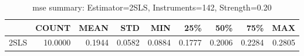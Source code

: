 \begin{table}[ht]
\centering
\caption{mse summary: Estimator=2SLS, Instruments=142, Strength=0.20}
\begin{tabular}{lrrrrrrrr}
\toprule
 & COUNT & MEAN & STD & MIN & 25\% & 50\% & 75\% & MAX \\
\midrule
2SLS & 10.0000 & 0.1944 & 0.0582 & 0.0884 & 0.1777 & 0.2006 & 0.2284 & 0.2805 \\
\bottomrule
\end{tabular}
\end{table}
